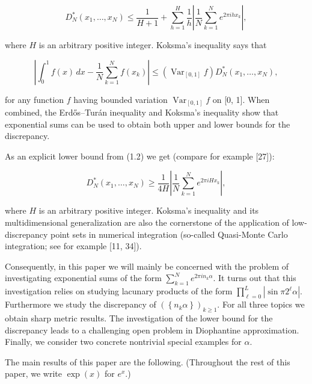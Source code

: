 \documentclass[10pt]{article}
\newcommand{\1}{\mathbf{1}}
\begin{document}
\begin{equation*}
D_{N}^{*}\left(x_{1}, \ldots, x_{N}\right) \leqslant \frac{1}{H+1}+\sum_{h=1}^{H} \frac{1}{h}\left|\frac{1}{N} \sum_{k=1}^{N} e^{2 \pi i h x_{k}}\right|, \tag{1.1}
\end{equation*}


where $H$ is an arbitrary positive integer. Koksma's inequality says that


\begin{equation*}
\left|\int_{0}^{1} f(x)\,dx-\frac{1}{N} \sum_{k=1}^{N} f\left(x_{k}\right)\right| \leqslant\left(\operatorname{Var}_{[0,1]} f\right) D_{N}^{*}\left(x_{1}, \ldots, x_{N}\right), \tag{1.2}
\end{equation*}


for any function $f$ having bounded variation $\operatorname{Var}_{[0,1]} f$ on [0, 1]. When combined, the Erdős--Turán inequality and Koksma's inequality show that exponential sums can be used to obtain both upper and lower bounds for the discrepancy.

As an explicit lower bound from (1.2) we get (compare for example [27]):


\begin{equation*}
D_{N}^{*}\left(x_{1}, \ldots, x_{N}\right) \geqslant \frac{1}{4 H}\left|\frac{1}{N} \sum_{k=1}^{N} e^{2 \pi i H x_{k}}\right|, \tag{1.3}
\end{equation*}


where $H$ is an arbitrary positive integer. Koksma's inequality and its multidimensional generalization are also the cornerstone of the application of low-discrepancy point sets in numerical integration (so-called Quasi-Monte Carlo integration; see for example [11, 34]).

Consequently, in this paper we will mainly be concerned with the problem of investigating exponential sums of the form $\sum_{k=1}^{N} e^{2 \pi i n_{k} \alpha}$. It turns out that this investigation relies on studying lacunary products of the form $\prod_{\ell=0}^{L}\left|\sin \pi 2^{\ell} \alpha\right|$. Furthermore we study the discrepancy of $\left(\left\{n_{k} \alpha\right\}\right)_{k \geqslant 1}$. For all three topics we obtain sharp metric results. The investigation of the lower bound for the discrepancy leads to a challenging open problem in Diophantine approximation. Finally, we consider two concrete nontrivial special examples for $\alpha$.

The main results of this paper are the following. (Throughout the rest of this paper, we write $\exp (x)$ for $e^{x}$.)
\end{document}
